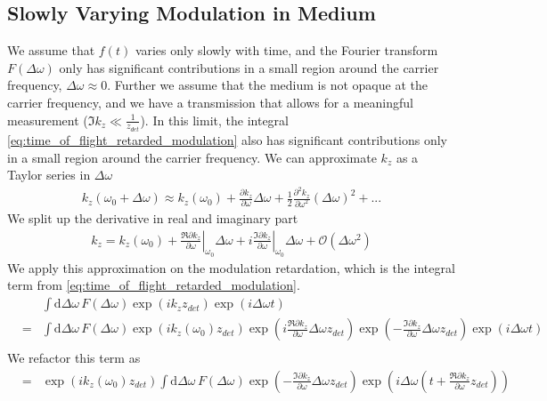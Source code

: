 \documentclass[12pt,a4paper,twoside,openright,BCOR10mm,headsepline,titlepage,abstracton,chapterprefix,final]{scrreprt}
\newcommand\wavenumber{k}
\newcommand{\orderof}[1]{\mathcal{O}(#1)}
\newcommand\totald{\textrm{d}}
\begin{document}
\subsection{Slowly Varying Modulation in Medium}
We assume that $f(t)$ varies only slowly with time, 
and the Fourier transform $F(\Delta \omega)$ only has significant contributions 
in a small region around the carrier frequency, $\Delta \omega \approx 0$.
Further we assume that the medium is not opaque at the carrier frequency, 
and we have a transmission that allows for a meaningful measurement ($\Im \wavenumber_z \ll \frac{1}{z_{det}}$).
In this limit, the integral \eqref{eq:time_of_flight_retarded_modulation} also has significant contributions 
only in a small region around the carrier frequency.
We can approximate $\wavenumber_z$ as a Taylor series in $\Delta \omega$
\begin{eqnarray}
 \wavenumber_z(\omega_0+\Delta\omega) 
 \approx \wavenumber_z(\omega_0) 
 + \frac{\partial \wavenumber_z}{\partial \omega} \Delta \omega 
 + \frac{1}{2} \frac{\partial^2 \wavenumber_z}{\partial \omega^2} (\Delta \omega)^2
 + ...
\end{eqnarray}
We split up the derivative in real and imaginary part
\begin{eqnarray}
 \wavenumber_z 
 = \wavenumber_z(\omega_0) 
 +   \left. \frac{\Re \partial \wavenumber_z}{\partial \omega}\right|_{\omega_0} \Delta \omega 
 + i \left. \frac{\Im \partial \wavenumber_z}{\partial \omega}\right|_{\omega_0} \Delta \omega 
 + \orderof{\Delta\omega^2}
\end{eqnarray}
We apply this approximation on the modulation retardation, which is the integral term from \eqref{eq:time_of_flight_retarded_modulation}.
\begin{eqnarray}
 &&\int \totald\Delta\omega\, 
      F(\Delta \omega)
      \exp (i \wavenumber_z z_{det})
      \exp ( i \Delta \omega t)
 \\&=&
 \int \totald\Delta\omega\, 
      F(\Delta \omega)
      \exp (i \wavenumber_z(\omega_0) z_{det})
      \exp (i \frac{\Re \partial \wavenumber_z}{\partial \omega} \Delta \omega z_{det})
      \exp (- \frac{\Im \partial \wavenumber_z}{\partial \omega} \Delta \omega z_{det})
      \exp ( i \Delta \omega t)
 \nonumber\\
\end{eqnarray}
We refactor this term as
\begin{eqnarray}
 &=&
 \exp (i \wavenumber_z(\omega_0) z_{det})
 \int \totald\Delta\omega\, 
      F(\Delta \omega)
      \exp \left(- \frac{\Im \partial \wavenumber_z}{\partial \omega} \Delta \omega z_{det}\right)
      \exp \left( i \Delta \omega \left(t + \frac{\Re \partial \wavenumber_z}{\partial \omega} z_{det}\right)\right)
 \nonumber\\
\end{eqnarray}
\end{document}
